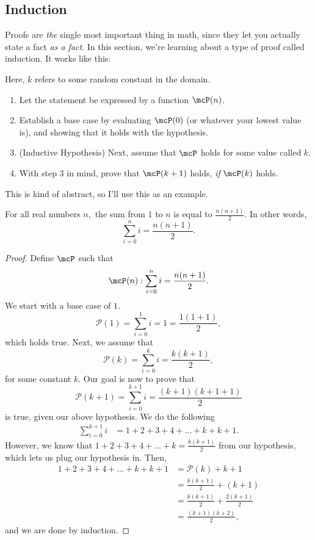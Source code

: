 \documentclass[11pt]{article}
\begin{document}
\subsection{Induction}
Proofs are \textit{the} single most important thing in math, since they let you actually state a fact \textit{as a fact}. In this section, we're learning about a type of proof called induction. It works like this:
\begin{defn}[Induction]
    Here, $k$ refers to some random constant in the domain.
    \begin{enumerate}
        \item Let the statement be expressed by a function $\mcP(n)$.
        \item Establish a base case by evaluating $\mcP(0)$ (or whatever your lowest value is), and showing that it holds with the hypothesis.
        \item (Inductive Hypothesis) Next, assume that $\mcP$ holds for some value called $k$.
        \item With step 3 in mind, prove that $\mcP(k+1)$ holds, \textit{if} $\mcP(k)$ holds.
    \end{enumerate}
\end{defn}
This is kind of abstract, so I'll use this as an example.
\begin{thrm}
	For all real numbers $n,$ the sum from $1$ to $n$ is equal to $\frac{n(n+1)}{2}$. In other words,
	\[\sum_{i=0}^{n} i = \frac{n(n+1)}{2}.\]
\end{thrm}
\begin{proof}
    Define $\mcP$ such that
    \[\mcP(n): \sum_{i=0}^{n} i = \frac{n(n+1)}{2}.\]
	We start with a base case of $1$.
	\[\mathcal{P}(1) = \sum_{i=0}^1 i = 1 = \frac{1(1+1)}{2},\]
	which holds true. Next, we assume that
	\[\mathcal{P}(k) = \sum_{i=0}^k i = \frac{k(k+1)}{2},\]
	for some constant $k$. Our goal is now to prove that
	\[\mathcal{P}(k+1) = \sum_{i=0}^{k+1} i = \frac{(k+1)(k+ 1 + 1)}{2}\]
	is true, given our above hypothesis. We do the following
	\begin{align*}
		 \sum_{i=0}^{k+1} i &= 1 + 2 + 3 + 4 + \dots + k + k + 1.
	\end{align*}
	However, we know that $1 + 2 + 3 + 4 + \dots  + k = \frac{k(k+1)}{2}$ from our hypothesis, which lets us plug our hypothesis in. Then,
	\begin{align*}
		 1 + 2 + 3 + 4 + \dots + k + k + 1 &= \mathcal{P}(k) + k + 1 \\
		 &= \frac{k(k+1)}{2} + (k+1) \\
		 &= \frac{k(k+1)}{2} + \frac{2(k+1)}{2}  \\
		 &= \frac{(k+1)(k+2)}{2},
	\end{align*}
	and we are done by induction.
\end{proof}
\end{document}
